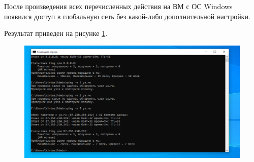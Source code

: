 \documentclass[a4paper,14pt]{extarticle}
\begin{document}
\begin{enumerate}
После произведения всех перечисленных действия на ВМ с ОС Windows появился доступ в
глобальную сеть без какой-либо дополнительной настройки.

	Результат приведен на рисунке \ref{fig:2022-03-3018-04-09}.
\begin{figure}[h!]
	\centering
	\includegraphics[width=0.7\linewidth]{images/Lesha/2022-03-30_18-04-09}
	\caption{}
	\label{fig:2022-03-3018-04-09}
\end{figure}
	
	
	
\end{enumerate}
\end{document}
